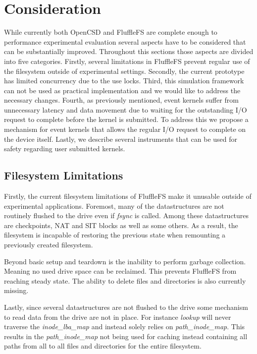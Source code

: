 \chapter{Consideration}

While currently both OpenCSD and FluffleFS are complete enough to performance
experimental evaluation several aspects have to be considered that can be
substantially improved. Throughout this sections those aspects are divided into
five categories. Firstly, several limitations in FluffleFS prevent regular use
of the filesystem outside of experimental settings. Secondly, the current
prototype has limited concurrency due to the use locks. Third, this simulation
framework can not be used as practical implementation and we would like to
address the necessary changes. Fourth, as previously mentioned, event kernels
suffer from unnecessary latency and data movement due to waiting for the
outstanding I/O request to complete before the kernel is submitted. To address
this we propose a mechanism for event kernels that allows the regular I/O
request to complete on the device itself. Lastly, we describe several
instruments that can be used for safety regarding user submitted kernels.

\section{Filesystem Limitations}

Firstly, the current filesystem limitations of FluffleFS make it unusable
outside of experimental applications. Foremost, many of the datastructures are
not routinely flushed to the drive even if \textit{fsync} is called. Among
these datastructures are checkpoints, NAT and SIT blocks as well as some others.
As a result, the filesystem is incapable of restoring the previous state when
remounting a previously created filesystem.

Beyond basic setup and teardown is the inability to perform garbage collection.
Meaning no used drive space can be reclaimed. This prevents FluffleFS from
reaching steady state. The ability to delete files and directories is also
currently missing.

Lastly, since several datastructures are not flushed to the drive some mechanism
to read data from the drive are not in place. For instance \textit{lookup} will
never traverse the \textit{inode\_lba\_map} and instead solely relies on
\textit{path\_inode\_map}. This results in the \textit{path\_inode\_map} not
being used for caching instead containing all paths from all to all files and
directories for the entire filesystem.

